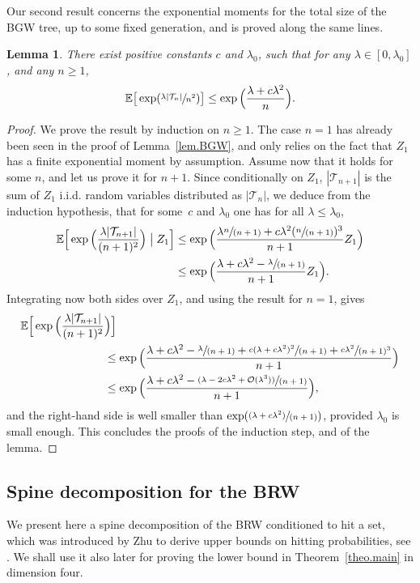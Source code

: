 \documentclass[JEP,XML,SOM,Unicode,NoFloatCountersInSection,published]{cedram}
\newcommand{\spfrac}[2]{\sfrac{#1}{(#2)}}
\newcommand{\pspfrac}[2]{\sfrac{(#1)}{(#2)}}
\theoremstyle{plain}
\newtheorem{lemma}[theorem]{Lemma}
\theoremstyle{definition}
\newcommand{\1}{{\text{\Large $\mathfrak 1$}}}
\begin{document}
Our second result concerns the exponential moments for the total size of the BGW tree, up to some fixed generation, and is proved along the same lines.
\begin{lemma}\label{lem.BGW2}
There exist positive constants $c$ and $\lambda_0$, such that for any $\lambda\in[0,\lambda_0]$, and any $n\ge 1$,
\begin{equation*}
\mathbb E\big[\exp(\sfrac{\lambda |\mathcal T_n|}{n^2})\big] \le \exp\Big(\frac{\lambda+c\lambda^2}{n}\Big).
\end{equation*}
\end{lemma}
\begin{proof}
We prove the result by induction on $n\ge 1$. The case $n=1$ has already been seen in the proof of Lemma~\ref{lem.BGW},
and only relies on the fact that $Z_1$ has a finite exponential moment by assumption. Assume now that it holds for some $n$, and let us prove
it for $n+1$. Since conditionally on $Z_1$, $|\mathcal T_{n+1}|$ is the sum of $Z_1$ i.i.d. random variables distributed as $|\mathcal T_{n}|$, we deduce from the induction hypothesis, that for some~$c$ and $\lambda_0$ one has for all $\lambda\le \lambda_0$,
\begin{align*}
\mathbb E\Big[\exp\Big(\frac{\lambda |\mathcal T_{n+1}|}{(n+1)^2}\Big)\bigm| Z_1\Big]
&\le \exp\Big(\frac{\lambda\spfrac{n}{n+1}+c\lambda^2(\spfrac{n}{n+1})^3}{n+1}Z_1\Big)\\
&\le \exp\Big(\frac{\lambda+c\lambda^2 - \spfrac{\lambda}{n+1} }{n+1}Z_1\Big).
\end{align*}
Integrating now both sides over $Z_1$, and using the result for $n=1$, gives
\begin{align*}
\mathbb E\Big[\exp\Big(\frac{\lambda |\mathcal T_{n+1}|}{(n+1)^2}&\Big)\Big]\\
&\le \exp\Big(\frac{\lambda+c\lambda^2 - \spfrac{\lambda}{n+1}+\spfrac{c(\lambda + c\lambda^2)^2}{n+1} +\sfrac{c\lambda^2}{(n+1)^3}}{n+1}\Big)\\
&\le \exp\Big(\frac{\lambda+c\lambda^2 - \pspfrac{\lambda - 2c\lambda^2+ \mathcal O(\lambda^3)}{n+1} }{n+1} \Big),
\end{align*}
and the right-hand side is well smaller than $\exp(\pspfrac{\lambda + c\lambda^2}{n+1})$, provided $\lambda_0$ is small enough.
This concludes the proofs of the induction step, and of the lemma.
\end{proof}

\subsection{Spine decomposition for the BRW}
We present here a spine decomposition of the BRW conditioned to hit a set, which was introduced by Zhu to derive upper bounds on hitting probabilities, see \cite{Zhu1, Zhu3}. We shall
use it also later for proving the lower bound in Theorem~\ref{theo.main}
in dimension four.
\end{document}
